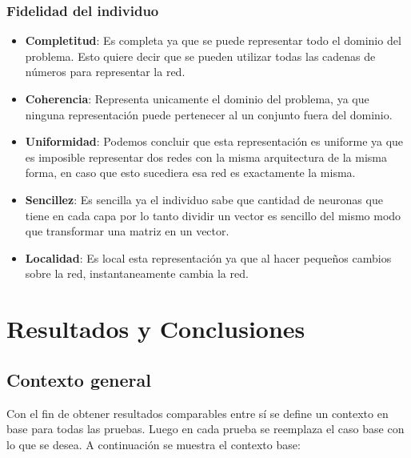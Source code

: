 \documentclass{sig-alternate}
\begin{document}
	\subsubsection{Fidelidad del individuo}

	\begin{itemize}
		\item \textbf{Completitud}: Es completa ya que se puede representar todo el dominio del problema. Esto quiere decir que se pueden utilizar todas las cadenas de números para representar la red. 

		\item \textbf{Coherencia}: Representa unicamente el dominio del problema, ya que ninguna representación puede pertenecer al un conjunto fuera del dominio.

		\item \textbf{Uniformidad}: Podemos concluir que esta representación es uniforme ya que es imposible representar dos redes con la misma arquitectura de la misma forma, en caso que esto sucediera esa red es exactamente la misma.	

		\item \textbf{Sencillez}: Es sencilla ya el individuo sabe que cantidad de neuronas que tiene en cada capa por lo tanto dividir un vector es sencillo del mismo modo que transformar una matriz en un vector.

		\item \textbf{Localidad}: Es local esta representación ya que al hacer pequeños cambios sobre la red, instantaneamente cambia la red.
	\end{itemize}
	
\section{Resultados y Conclusiones}

	\subsection{Contexto general}

	Con el fin de obtener resultados comparables entre sí se define un contexto en base para todas las pruebas. Luego en cada prueba se reemplaza el caso base con lo que se desea. A continuación se muestra el contexto base:
\end{document}
